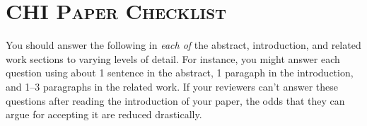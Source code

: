 

\newenvironment{checklist}{%
  \begin{list}{}{}%
  \let\olditem\item
  \renewcommand\item{\olditem[$\Box$] }
}{%
  \end{list}
}


\section*{\textsc{CHI Paper Checklist}}






\noindent\makebox[\linewidth]{\rule{\linewidth}{0.4pt}}

You should answer the following in \emph{each of} the abstract, introduction, and related work sections to varying levels of detail. For instance, you might answer each question using about 1 sentence in the abstract, 1 paragaph in the introduction, and 1--3 paragraphs in the related work. If your reviewers can't answer these questions after reading the introduction of your paper, the odds that they can argue for accepting it are reduced drastically. 


